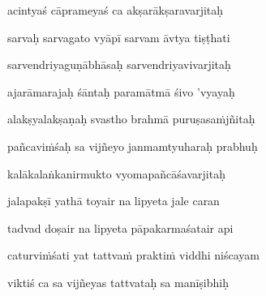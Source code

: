 acintyaś cāprameyaś ca akṣarākṣaravarjitaḥ\thinspace{\dandab} \dontdisplaylinenum

sarvaḥ sarvagato vyāpī sarvam āvtya tiṣṭhati \veg\dontdisplaylinenum
{}

sarvendriyaguṇābhāsaḥ sarvendriyavivarjitaḥ\thinspace{\dandab} \dontdisplaylinenum

ajarāmarajaḥ śāntaḥ paramātmā śivo 'vyayaḥ \veg\dontdisplaylinenum
{}

alakṣyalakṣaṇaḥ svastho brahmā puruṣasaṁjñitaḥ\thinspace{\dandab} \dontdisplaylinenum

pañcaviṁśaḥ sa vijñeyo janmamtyuharaḥ prabhuḥ \veg\dontdisplaylinenum
{}

kalākalaṅkanirmukto vyomapañcāśavarjitaḥ\thinspace{\dandab} \dontdisplaylinenum

jalapakṣī yathā toyair na lipyeta jale caran \danda\dontdisplaylinenum

tadvad doṣair na lipyeta pāpakarmaśatair api \veg\dontdisplaylinenum



caturviṁśati yat tattvaṁ praktiṁ viddhi niścayam\thinspace{\dandab} \dontdisplaylinenum

viktiś ca sa vijñeyas tattvataḥ sa manīṣibhiḥ \veg\dontdisplaylinenum
{}

